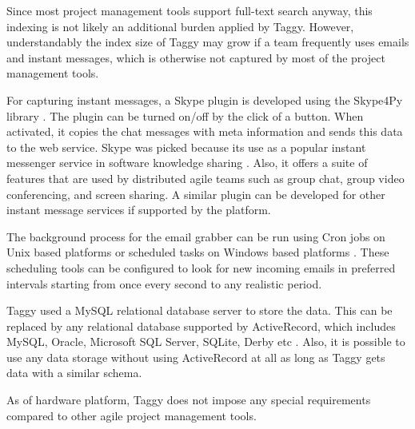 Since most project management tools support full-text search anyway, this indexing is not likely an additional burden applied by Taggy. However, understandably the index size of Taggy may grow if a team frequently uses emails and instant messages, which is otherwise not captured by most of the project management tools.

For capturing instant messages, a Skype plugin is developed using the Skype4Py library \cite{skype4py}. The plugin can be turned on/off by the click of a button. When activated, it copies the chat messages with meta information and sends this data to the web service. Skype was picked because its use as a popular instant messenger service in software knowledge sharing \cite{how_did_we}. Also, it offers a suite of features that are used by distributed agile teams such as group chat, group video conferencing, and screen sharing. A similar plugin can be developed for other instant message services if supported by the platform.

The background process for the email grabber can be run using Cron jobs on Unix based platforms or scheduled tasks on Windows based platforms \cite{cron, scheduled_tasks}. These scheduling tools can be configured to look for new incoming emails in preferred intervals starting from once every second to any realistic period.

Taggy used a MySQL relational database server to store the data. This can be replaced by any relational database supported by ActiveRecord, which includes MySQL, Oracle, Microsoft SQL Server, SQLite, Derby etc \cite{active_record}. Also, it is possible to use any data storage without using ActiveRecord at all as long as Taggy gets data with a similar schema.

As of hardware platform, Taggy does not impose any special requirements compared to other agile project management tools.
